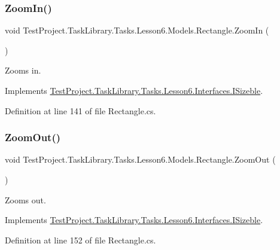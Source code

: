 \subsubsection{\texorpdfstring{ZoomIn()}{ZoomIn()}}
{\footnotesize\ttfamily void Test\+Project.\+Task\+Library.\+Tasks.\+Lesson6.\+Models.\+Rectangle.\+Zoom\+In (\begin{DoxyParamCaption}{ }\end{DoxyParamCaption})}



Zooms in. 



Implements \mbox{\hyperlink{interface_test_project_1_1_task_library_1_1_tasks_1_1_lesson6_1_1_interfaces_1_1_i_sizeble_ada6181d54740d570d1575307c2574a0d}{Test\+Project.\+Task\+Library.\+Tasks.\+Lesson6.\+Interfaces.\+I\+Sizeble}}.



Definition at line 141 of file Rectangle.\+cs.

\mbox{\label{class_test_project_1_1_task_library_1_1_tasks_1_1_lesson6_1_1_models_1_1_rectangle_a209c6d610377927da638f31feecfbed0}} 
\subsubsection{\texorpdfstring{ZoomOut()}{ZoomOut()}}
{\footnotesize\ttfamily void Test\+Project.\+Task\+Library.\+Tasks.\+Lesson6.\+Models.\+Rectangle.\+Zoom\+Out (\begin{DoxyParamCaption}{ }\end{DoxyParamCaption})}



Zooms out. 



Implements \mbox{\hyperlink{interface_test_project_1_1_task_library_1_1_tasks_1_1_lesson6_1_1_interfaces_1_1_i_sizeble_ab4a49e0b6bbc4aa62f9ac1175b73e704}{Test\+Project.\+Task\+Library.\+Tasks.\+Lesson6.\+Interfaces.\+I\+Sizeble}}.



Definition at line 152 of file Rectangle.\+cs.



